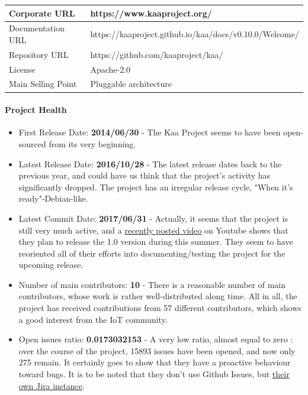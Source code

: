 \documentclass{article}
\begin{document}
\begin{center}
\begin{tabular}{|l|l|}
\hline
Corporate URL & https://www.kaaproject.org/ \\ \hline
Documentation URL & https://kaaproject.github.io/kaa/docs/v0.10.0/Welcome/ \\ \hline
Repository URL & https://github.com/kaaproject/kaa/ \\ \hline
License & Apache-2.0 \\ \hline
Main Selling Point & Pluggable architecture \\ \hline
\end{tabular}
\end{center}


\paragraph{Project Health}

\begin{itemize}
\item First Release Date: \textbf{2014/06/30} - The Kaa Project seems to have been open-sourced from its very beginning.
\item Latest Release Date: \textbf{2016/10/28} - The latest release dates back to the previous year, and could have us think that the project's activity has significantly dropped. The project has an irregular release cycle, "When it's ready"-Debian-like.
\item Latest Commit Date: \textbf{2017/06/31} - Actually, it seems that the project is still very much active, and a \href{https://www.youtube.com/watch?v=PaRSwYIGMG4}{recently posted video} on Youtube shows that they plan to release the 1.0 version during this summer. They seem to have reoriented all of their efforts into documenting/testing the project for the upcoming release.
\item Number of main contributors: \textbf{10} - There is a reasonable number of main contributors, whose work is rather well-distributed along time. All in all, the project has received contributions from 57 different contributors, which shows a good interest from the IoT community.
\item Open issues ratio: \textbf{0.0173032153} - A very low ratio, almost equal to zero : over the course of the project, 15893 issues have been opened, and now only 275 remain. It certainly goes to show that they have a proactive behaviour toward bugs. It is to be noted that they don't use Github Issues, but \href{http://jira.kaaproject.org/projects/KAA/issues/}{their own Jira instance}.
\end{itemize}
\end{document}
